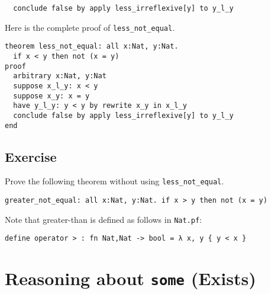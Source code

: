 \documentclass[12pt]{article}
\begin{document}
\begin{verbatim}
  conclude false by apply less_irreflexive[y] to y_l_y
\end{verbatim}

Here is the complete proof of \texttt{less\_not\_equal}.

\begin{verbatim}
theorem less_not_equal: all x:Nat, y:Nat.
  if x < y then not (x = y)
proof
  arbitrary x:Nat, y:Nat
  suppose x_l_y: x < y
  suppose x_y: x = y
  have y_l_y: y < y by rewrite x_y in x_l_y
  conclude false by apply less_irreflexive[y] to y_l_y
end
\end{verbatim}

\subsection{Exercise}

Prove the following theorem without using \texttt{less\_not\_equal}.

\begin{verbatim}
greater_not_equal: all x:Nat, y:Nat. if x > y then not (x = y)
\end{verbatim}

Note that greater-than is defined as follows in \texttt{Nat.pf}:

\begin{verbatim}
define operator > : fn Nat,Nat -> bool = λ x, y { y < x }
\end{verbatim}

\pagebreak

\section{Reasoning about \texttt{some} (Exists)}
\label{sec:exists}
\end{document}
